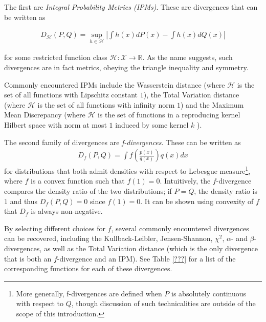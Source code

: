The first are \emph{Integral Probability Metrics (IPMs)}. 
These are divergences that can be written as

\begin{align*}
D_{\mathcal{H}}(P, Q) = \sup_{h\in\mathcal{H}} \left| \int h(x) dP(x) - \int h(x) dQ(x) \right|
\end{align*}

for some restricted function class $\mathcal{H}: \mathcal{X} \to \mathbb{R}$. 
As the name suggests, such divergences are in fact metrics, obeying the triangle inequality and symmetry.

Commonly encountered IPMs include the Wasserstein distance (where $\mathcal{H}$ is the set of all functions with Lipschitz constant $1$), the Total Variation distance (where $\mathcal{H}$ is the set of all functions with infinity norm $1$) and the Maximum Mean Discrepancy (where $\mathcal{H}$ is the set of functions in a reproducing kernel Hilbert space with norm at most $1$ induced by some kernel $k$ \cite{gretton}).

The second family of divergences are \emph{f-divergences}. 
These can be written as
\begin{align*}
D_f(P, Q) = \int f\left(\frac{p(x)}{q(x)}\right) q(x) dx
\end{align*}
for distributions that both admit densities with respect to Lebesgue measure\footnote{More generally, f-divergences are defined when $P$ is absolutely continuous with respect to $Q$, though discussion of such technicalities are outside of the scope of this introduction.}, where $f$ is a convex function such that $f(1)=0$. 
Intuitively, the $f$-divergence compares the density ratio of the two distributions; if $P=Q$, the density ratio is $1$ and thus $D_f(P,Q) = 0$ since $f(1)=0$. 
It can be shown using convexity of $f$ that $D_f$ is always non-negative.

By selecting different choices for $f$, several commonly encountered divergences can be recovered, including the Kullback-Leibler, Jensen-Shannon, $\chi^2$, $\alpha$- and $\beta$-divergences, as well as the Total Variation distance (which is the only divergence that is both an $f$-divergence and an IPM).
See Table \ref{???} for a list of the corresponding functions for each of these divergences.



